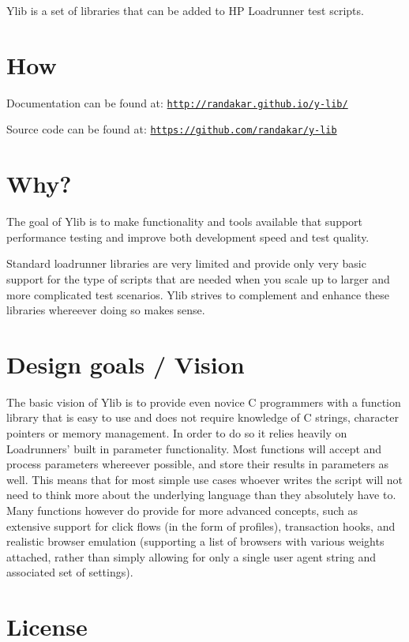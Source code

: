Ylib is a set of libraries that can be added to H\-P Loadrunner test scripts.

\section*{How}

Documentation can be found at\-: \href{http://randakar.github.io/y-lib/}{\tt http\-://randakar.\-github.\-io/y-\/lib/}

Source code can be found at\-: \href{https://github.com/randakar/y-lib}{\tt https\-://github.\-com/randakar/y-\/lib}

\section*{Why?}

The goal of Ylib is to make functionality and tools available that support performance testing and improve both development speed and test quality.

Standard loadrunner libraries are very limited and provide only very basic support for the type of scripts that are needed when you scale up to larger and more complicated test scenarios. Ylib strives to complement and enhance these libraries whereever doing so makes sense.

\section*{Design goals / Vision}

The basic vision of Ylib is to provide even novice C programmers with a function library that is easy to use and does not require knowledge of C strings, character pointers or memory management. In order to do so it relies heavily on Loadrunners' built in parameter functionality. Most functions will accept and process parameters whereever possible, and store their results in parameters as well. This means that for most simple use cases whoever writes the script will not need to think more about the underlying language than they absolutely have to. Many functions however do provide for more advanced concepts, such as extensive support for click flows (in the form of profiles), transaction hooks, and realistic browser emulation (supporting a list of browsers with various weights attached, rather than simply allowing for only a single user agent string and associated set of settings).

\section*{License}

